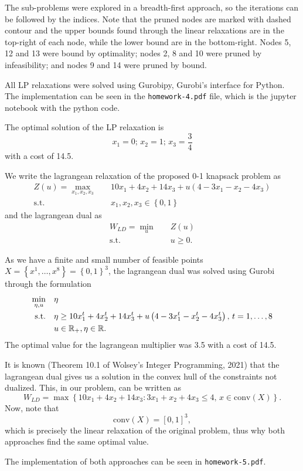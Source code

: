\documentclass[a4paper]{report}
\begin{document}
The sub-problems were explored in a breadth-first approach, so the iterations can be followed by the indices. Note that the pruned nodes are marked with dashed contour and the upper bounds found through the linear relaxations are in the top-right of each node, while the lower bound are in the bottom-right. Nodes 5, 12 and 13 were bound by optimality; nodes 2, 8 and 10 were pruned by infeasibility; and nodes 9 and 14 were pruned by bound.

All LP relaxations were solved using Gurobipy, Gurobi's interface for Python. The implementation can be seen in the \texttt{homework-4.pdf} file, which is the jupyter notebook with the python code.


The optimal solution of the LP relaxation is \[
x_1 = 0;\, x_2=1;\, x_3=\frac{3}{4}
\] with a cost of 14.5.

We write the lagrangean relaxation of the proposed 0-1 knapsack problem as
\begin{align*}
    Z(u) = \max_{x_1,x_2,x_3} \quad & 10x_1+4x_2+14x_3 + u\left( 4-3x_1-x_2-4x_3 \right)  \\
    \textrm{s.t.} \quad & x_1,x_2,x_3\in \left\{ 0,1 \right\}
\end{align*}
and the lagrangean dual as
\begin{align*}
    W_{LD} = \min_{u} \quad & Z(u) \\
    \textrm{s.t.} \quad & u\ge 0
.\end{align*}

As we have a finite and small number of feasible points $X=\left\{ x^{1},\ldots,x^{8} \right\} = \left\{ 0,1 \right\}^{3}$, the lagrangean dual was solved using Gurobi through the formulation
\begin{align*}
    \min_{\eta,u} \quad & \eta \\
    \textrm{s.t.} \quad & \eta \ge 10x_1^{t}+4x_2^{t}+14x_3^{t} + u\left( 4-3x_1^{t}-x_2^{t}-4x_3^{t} \right),\, t=1,\ldots,8  \\
      & u\in \mathbb{R}_+,\eta\in \mathbb{R}
.\end{align*}
The optimal value for the lagrangean multiplier was 3.5 with a cost of 14.5.

It is known (Theorem 10.1 of Wolsey's Integer Programming, 2021) that the lagrangean dual gives us a solution in the convex hull of the constraints not dualized. This, in our problem, can be written as \[
W_{LD} = \max\left\{ 10x_1+4x_2+14x_3 : 3x_1+x_2+4x_3\le 4,\, x\in \text{conv}\left( X \right)  \right\} 
.\] Now, note that \[
\text{conv}\left( X \right) = \left[ 0,1 \right] ^{3}
,\] which is precisely the linear relaxation of the original problem, thus why both approaches find the same optimal value.

The implementation of both approaches can be seen in \texttt{homework-5.pdf}.
\end{document}

